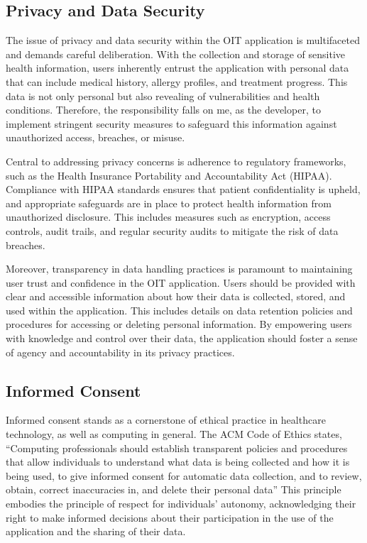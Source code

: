 \subsection{Privacy and Data Security}
The issue of privacy and data security within the OIT application is multifaceted and demands careful deliberation. With the collection and storage of sensitive health information, users inherently entrust the application with personal data that can include medical history, allergy profiles, and treatment progress. This data is not only personal but also revealing of vulnerabilities and health conditions. Therefore, the responsibility falls on me, as the developer, to implement stringent security measures to safeguard this information against unauthorized access, breaches, or misuse.

Central to addressing privacy concerns is adherence to regulatory frameworks, such as the Health Insurance Portability and Accountability Act (HIPAA). Compliance with HIPAA standards ensures that patient confidentiality is upheld, and appropriate safeguards are in place to protect health information from unauthorized disclosure. This includes measures such as encryption, access controls, audit trails, and regular security audits to mitigate the risk of data breaches.

Moreover, transparency in data handling practices is paramount to maintaining user trust and confidence in the OIT application. Users should be provided with clear and accessible information about how their data is collected, stored, and used within the application. This includes details on data retention policies and procedures for accessing or deleting personal information. By empowering users with knowledge and control over their data, the application should foster a sense of agency and accountability in its privacy practices.

\subsection{Informed Consent}
Informed consent stands as a cornerstone of ethical practice in healthcare technology, as well as computing in general. The ACM Code of Ethics states, ``Computing professionals should establish transparent policies and procedures that allow individuals to understand what data is being collected and how it is being used, to give informed consent for automatic data collection, and to review, obtain, correct inaccuracies in, and delete their personal data'' \cite{ACM} This principle embodies the principle of respect for individuals' autonomy, acknowledging their right to make informed decisions about their participation in the use of the application and the sharing of their data.

